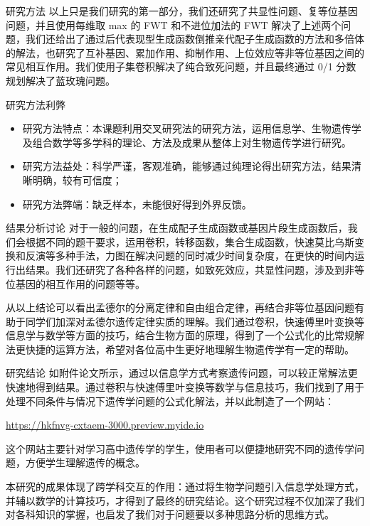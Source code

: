 \documentclass{beamer}
\begin{document}
	\begin{frame}{研究方法}
		以上只是我们研究的第一部分，我们还研究了共显性问题、复等位基因问题，并且使用每维取 max 的 FWT 和不进位加法的 FWT 解决了上述两个问题，我们还给出了通过后代表现型生成函数倒推亲代配子生成函数的方法和多倍体的解法，也研究了互补基因、累加作用、抑制作用、上位效应等非等位基因之间的常见相互作用。我们使用子集卷积解决了纯合致死问题，并且最终通过 0/1 分数规划解决了蓝玫瑰问题。
	\end{frame}
	
	\begin{frame}{研究方法利弊}
		\begin{itemize}
			\item 研究方法特点：本课题利用交叉研究法的研究方法，运用信息学、生物遗传学及组合数学等多学科的理论、方法及成果从整体上对生物遗传学进行研究。
			\item 研究方法益处：科学严谨，客观准确，能够通过纯理论得出研究方法，结果清晰明确，较有可信度；
			\item 研究方法弊端：缺乏样本，未能很好得到外界反馈。
		\end{itemize}
	\end{frame}

	\begin{frame}{结果分析讨论}
		对于一般的问题，在生成配子生成函数或基因片段生成函数后，我们会根据不同的题干要求，运用卷积，转移函数，集合生成函数，快速莫比乌斯变换和反演等多种手法，力图在解决问题的同时减少时间复杂度，在更快的时间内运行出结果。我们还研究了各种各样的问题，如致死效应，共显性问题，涉及到非等位基因的相互作用的问题等等。
		
		从以上结论可以看出孟德尔的分离定律和自由组合定律，再结合非等位基因问题有助于同学们加深对孟德尔遗传定律实质的理解。我们通过卷积，快速傅里叶变换等信息学与数学等方面的技巧，结合生物方面的原理，得到了一个公式化的比常规解法更快捷的运算方法，希望对各位高中生更好地理解生物遗传学有一定的帮助。
	\end{frame}

	\begin{frame}{研究结论}
		如附件论文所示，通过以信息学方式考察遗传问题，可以较正常解法更快速地得到结果。通过卷积与快速傅里叶变换等数学与信息技巧，我们找到了用于处理不同条件与情况下遗传学问题的公式化解法，并以此制造了一个网站：
		
		\href{https://hkfnvg-cxtaem-3000.preview.myide.io}{https://hkfnvg-cxtaem-3000.preview.myide.io}
		
		这个网站主要针对学习高中遗传学的学生，使用者可以便捷地研究不同的遗传学问题，方便学生理解遗传的概念。
		
		本研究的成果体现了跨学科交互的作用：通过将生物学问题引入信息学处理方式，并辅以数学的计算技巧，才得到了最终的研究结论。这个研究过程不仅加深了我们对各科知识的掌握，也启发了我们对于问题要以多种思路分析的思维方式。
	\end{frame}
\end{document}
